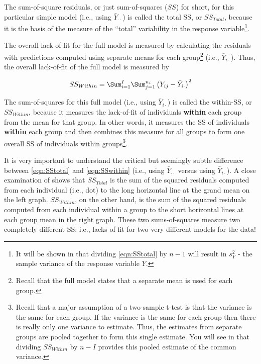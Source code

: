 \documentclass[10pt,openany]{book}\usepackage[]{graphicx}\usepackage[]{color}
\begin{document}
The sum-of-square residuals, or just sum-of-squares ($SS$) for short, for this particular simple model (i.e., using  $\bar{Y}_{\cdot\cdot}$) is called the total SS, or $SS_{Total}$, because it is the basis of the measure of the ``total'' variability in the response variable\footnote{It will be shown in  that dividing \eqref{eqn:SStotal} by $n-1$ will result in $s_{Y}^{2}$ - the sample variance of the response variable $Y$.}.


The overall lack-of-fit for the full model is measured by calculating the residuals with predictions computed using separate means for each group\footnote{Recall that the full model states that a separate mean is used for each group.} (i.e., $\bar{Y}_{i\cdot}$).  Thus, the overall lack-of-fit of the full model is measured by

\begin{equation} \label{eqn:SSwithin}
  SS_{Within} = \Sum_{i=1}^{I}\Sum_{j=1}^{n_{i}}\left(Y_{ij}-\bar{Y}_{i\cdot}\right)^{2}
\end{equation}

The sum-of-squares for this full model (i.e., using  $\bar{Y}_{i\cdot}$) is called the within-SS, or $SS_{Within}$, because it measures the lack-of-fit of individuals \textbf{within} each group from the mean for that group.  In other words, it measures the SS of individuals \textbf{within} each group and then combines this measure for all groups to form one overall SS of individuals within groups\footnote{Recall that a major assumption of a two-sample t-test is that the variance is the same for each group.  If the variance is the same for each group then there is really only one variance to estimate.  Thus, the estimates from separate groups are pooled together to form this single estimate.  You will see in  that dividing $SS_{Within}$ by $n-I$ provides this pooled estimate of the common variance.}.


It is very important to understand the critical but seemingly subtle difference between \eqref{eqn:SStotal} and \eqref{eqn:SSwithin} (i.e., using $\bar{Y}_{\cdot\cdot}$ versus using $\bar{Y}_{i\cdot}$).  A close examination of  shows that $SS_{Total}$ is the sum of the squared residuals computed from each individual (i.e., dot) to the long horizontal line at the grand mean on the left graph.  $SS_{Within}$, on the other hand, is the sum of the squared residuals computed from each individual within a group to the short horizontal lines at each group mean in the right graph.  These two sums-of-squares measure two completely different SS; i.e., lacks-of-fit for two very different models for the data!
\end{document}
